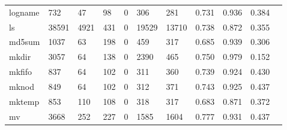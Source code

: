 \begin{longtable}{lp{1.10cm}p{1.10cm}p{1.10cm}p{1.10cm}p{1.10cm}p{1.10cm}p{1.10cm}p{1.10cm}p{1.10cm}p{1.10cm}}
logname   &                    732 &                                 47 &                                98 &                                0 &                               306 &                             281 &                          0.731 &                                 0.936 &                               0.384 \\
ls        &                  38591 &                               4921 &                               431 &                                0 &                             19529 &                           13710 &                          0.738 &                                 0.872 &                               0.355 \\
md5sum    &                   1037 &                                 63 &                               198 &                                0 &                               459 &                             317 &                          0.685 &                                 0.939 &                               0.306 \\
mkdir     &                   3057 &                                 64 &                               138 &                                0 &                              2390 &                             465 &                          0.750 &                                 0.979 &                               0.152 \\
mkfifo    &                    837 &                                 64 &                               102 &                                0 &                               311 &                             360 &                          0.739 &                                 0.924 &                               0.430 \\
mknod     &                    849 &                                 64 &                               102 &                                0 &                               312 &                             371 &                          0.743 &                                 0.925 &                               0.437 \\
mktemp    &                    853 &                                110 &                               108 &                                0 &                               318 &                             317 &                          0.683 &                                 0.871 &                               0.372 \\
mv        &                   3668 &                                252 &                               227 &                                0 &                              1585 &                            1604 &                          0.777 &                                 0.931 &                               0.437 \\

\end{longtable}
